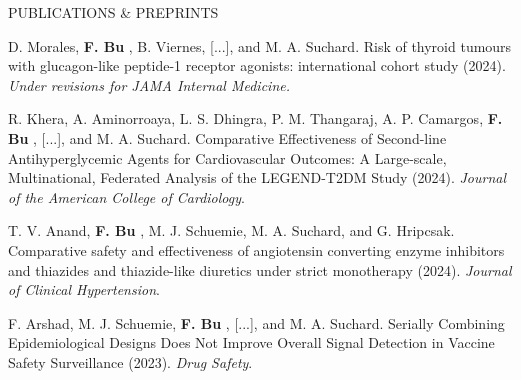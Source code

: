\documentclass{resume} %
\newcommand{\myName}[1]{
	\textbf{#1}
}
\begin{document}
\begin{rSection}{PUBLICATIONS \& PREPRINTS}
% 

D. Morales, \myName{F. Bu}, B. Viernes, [...], and M. A. Suchard. Risk of thyroid tumours with glucagon-like peptide-1 receptor agonists: international cohort study (2024). \emph{Under revisions for JAMA Internal Medicine.} 


R. Khera, A. Aminorroaya, L. S. Dhingra, P. M.  Thangaraj, A. P. Camargos, \myName{F. Bu}, [...], and M. A. Suchard. Comparative Effectiveness of Second-line Antihyperglycemic Agents for Cardiovascular Outcomes: A Large-scale, Multinational, Federated Analysis of the LEGEND-T2DM Study (2024). \emph{Journal of the American College of Cardiology}. 


%
%
%
%
%

T. V. Anand,\myName{F. Bu}, M. J. Schuemie, M. A. Suchard, and G. Hripcsak. Comparative safety and effectiveness of angiotensin converting enzyme inhibitors and thiazides and thiazide-like diuretics under strict monotherapy (2024).  \emph{Journal of Clinical Hypertension}.

%
%

F. Arshad, M. J. Schuemie, \myName{F. Bu}, [...], and M. A. Suchard. Serially Combining Epidemiological Designs Does Not Improve Overall Signal Detection in Vaccine Safety Surveillance (2023). \emph{Drug Safety}. 

%
%
%
%


\end{rSection}
\end{document}
